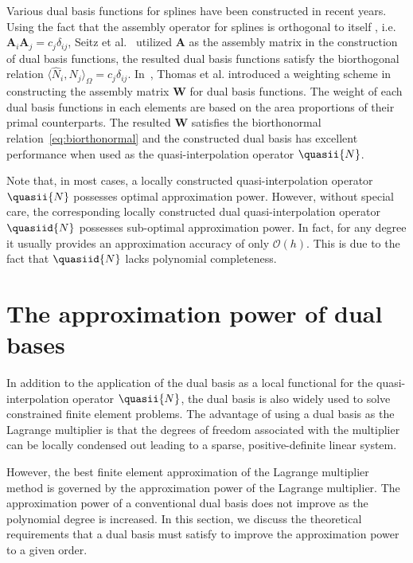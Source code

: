 \begin{remark}
	Various dual basis functions for splines have been constructed in recent years. Using the fact that the assembly operator for splines is orthogonal to itself , i.e. $\mathbf{A}_i\mathbf{A}_j = c_j\delta_{ij}$, Seitz et al.~\cite{seitz2016isogeometric} utilized $\mathbf{A}$ as the assembly matrix in the construction of dual basis functions, the resulted dual basis functions satisfy the biorthogonal relation $\langle\hat{N}_i,N_j\rangle_\Omega=c_j\delta_{ij}$. In~\cite{thomas2015bezier}, Thomas et al. introduced a weighting scheme in constructing the assembly matrix $\mathbf{W}$ for dual basis functions. The weight of each dual basis functions in each elements are based on the area proportions of their primal counterparts. The resulted $\mathbf{W}$ satisfies the biorthonormal relation~\eqref{eq:biorthonormal} and the constructed dual basis has excellent performance when used as the quasi-interpolation operator $\quasii{N}$.
\end{remark}

\begin{remark}\label{rm:dual_qi_sub_optimal}
	Note that, in most cases, a locally constructed quasi-interpolation operator $\quasii{N}$ possesses optimal approximation power. However, without special care, the corresponding locally constructed dual quasi-interpolation operator $\quasiid{N}$ possesses sub-optimal approximation power. In fact, for any degree it usually provides an approximation accuracy of only $\mathcal{O}(h)$. This is due to the fact that $\quasiid{N}$ lacks polynomial completeness.
\end{remark}

\section{The approximation power of dual bases}\label{sec:approximation}

In addition to the application of the dual basis as a local functional for the quasi-interpolation operator $\quasii{N}$, the dual basis is also widely used to solve constrained finite element problems. The advantage of using a dual basis as the Lagrange multiplier is that the degrees of freedom associated with the multiplier can be locally condensed out leading to a sparse, positive-definite linear system.

However, the best finite element approximation of the Lagrange multiplier method is governed by the approximation power of the Lagrange multiplier. The approximation power of a conventional dual basis does not improve as the polynomial degree is increased. In this section, we discuss the theoretical requirements that a dual basis must satisfy to improve the approximation power to a given order. \par

